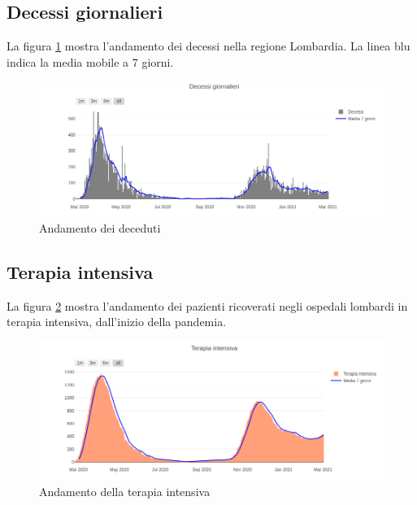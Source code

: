 \subsection{Decessi giornalieri}
La figura \ref{fig:decessi_lomb} mostra l'andamento dei decessi nella regione Lombardia.
La linea blu indica la media mobile a 7 giorni.
\begin{figure}[htp]
    \centering
    \includegraphics[width=14cm]{img/lomb/decessi_lomb.png}
    \caption{Andamento dei deceduti}
    \label{fig:decessi_lomb}
\end{figure}

\subsection{Terapia intensiva}
La figura \ref{fig:ti_lomb} mostra l'andamento dei pazienti ricoverati negli ospedali lombardi in terapia intensiva, dall'inizio della pandemia.
\begin{figure}[htp]
    \centering
    \includegraphics[width=12cm]{img/lomb/ti_lomb.png}
    \caption{Andamento della terapia intensiva}
    \label{fig:ti_lomb}
\end{figure}

